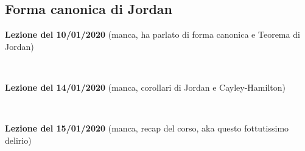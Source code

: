 \documentclass{article}
\theoremstyle{definition}
\begin{document}
\subsection{Forma canonica di Jordan}

\noindent \textbf{Lezione del 10/01/2020} (manca, ha parlato di forma canonica e Teorema di Jordan)

\

\noindent \textbf{Lezione del 14/01/2020} (manca, corollari di Jordan e Cayley-Hamilton)

\

\noindent \textbf{Lezione del 15/01/2020} (manca, recap del corso, aka questo fottutissimo delirio)
\end{document}
